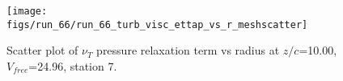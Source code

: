 \begin{figure}[H]
\centering
\texttt{[image: figs/run\_66/run\_66\_turb\_visc\_ettap\_vs\_r\_meshscatter]}
\caption{Scatter plot of $\nu_T$ pressure relaxation term vs radius at $z/c$=10.00, $V_{free}$=24.96, station 7.}
\label{fig:run_66_turb_visc_ettap_vs_r_meshscatter}
\end{figure}


